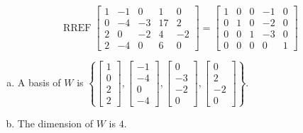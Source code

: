 \begin{exerciseAnswer} 


\[\operatorname{RREF} \left[\begin{array}{ccccc}
1 & -1 & 0 & 1 & 0 \\
0 & -4 & -3 & 17 & 2 \\
2 & 0 & -2 & 4 & -2 \\
2 & -4 & 0 & 6 & 0
\end{array}\right] = \left[\begin{array}{ccccc}
1 & 0 & 0 & -1 & 0 \\
0 & 1 & 0 & -2 & 0 \\
0 & 0 & 1 & -3 & 0 \\
0 & 0 & 0 & 0 & 1
\end{array}\right] \]


\begin{enumerate}[(a)]
\item A basis of \(W\) is \( \left\{ \left[\begin{array}{c}
1 \\
0 \\
2 \\
2
\end{array}\right] , \left[\begin{array}{c}
-1 \\
-4 \\
0 \\
-4
\end{array}\right] , \left[\begin{array}{c}
0 \\
-3 \\
-2 \\
0
\end{array}\right] , \left[\begin{array}{c}
0 \\
2 \\
-2 \\
0
\end{array}\right] \right\} \).
\item The dimension of \(W\) is \( 4 \).
\end{enumerate}
    
\end{exerciseAnswer}
    
